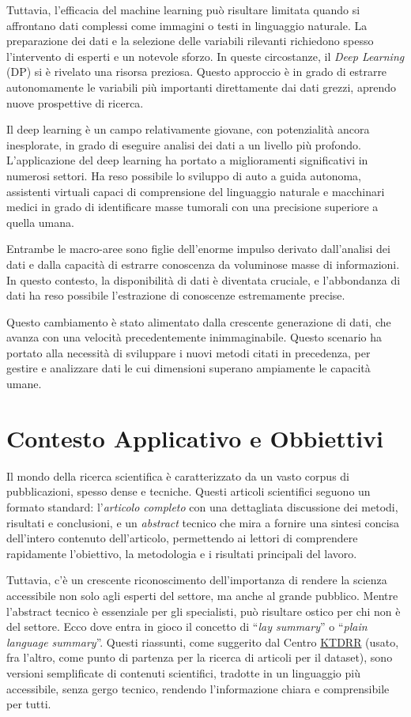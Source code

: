\documentclass[12pt,a4paper,twoside,openright]{book}
\begin{document}
Tuttavia, l'efficacia del machine learning può risultare limitata quando si affrontano dati complessi come immagini o testi in linguaggio naturale. La preparazione dei dati e la selezione delle variabili rilevanti richiedono spesso l'intervento di esperti e un notevole sforzo. In queste circostanze, il \emph{Deep Learning} (DP) si è rivelato una risorsa preziosa. Questo approccio è in grado di estrarre autonomamente le variabili più importanti direttamente dai dati grezzi, aprendo nuove prospettive di ricerca.

Il deep learning è un campo relativamente giovane, con potenzialità ancora inesplorate, in grado di eseguire analisi dei dati a un livello più profondo.
L'applicazione del deep learning ha portato a miglioramenti significativi in numerosi settori. Ha reso possibile lo sviluppo di auto a guida autonoma, assistenti virtuali capaci di comprensione del linguaggio naturale e macchinari medici in grado di identificare masse tumorali con una precisione superiore a quella umana.


Entrambe le macro-aree sono figlie dell'enorme impulso derivato dall'analisi dei dati e dalla capacità di estrarre conoscenza da voluminose masse di informazioni. In questo contesto, la disponibilità di dati è diventata cruciale, e l'abbondanza di dati ha reso possibile l'estrazione di conoscenze estremamente precise.

Questo cambiamento è stato alimentato dalla crescente generazione di dati, che avanza con una velocità precedentemente inimmaginabile. Questo scenario ha portato alla necessità di sviluppare i nuovi metodi citati in precedenza, per gestire e analizzare dati le cui dimensioni superano ampiamente le capacità umane.


\section{Contesto Applicativo e Obbiettivi}

Il mondo della ricerca scientifica è caratterizzato da un vasto corpus di pubblicazioni, spesso dense e tecniche. Questi articoli scientifici seguono un formato standard: l'\emph{articolo completo} con una dettagliata discussione dei metodi, risultati e conclusioni, e un \emph{abstract} tecnico che mira a fornire una sintesi concisa dell'intero contenuto dell'articolo, permettendo ai lettori di comprendere rapidamente l'obiettivo, la metodologia e i risultati principali del lavoro.

Tuttavia, c'è un crescente riconoscimento dell'importanza di rendere la scienza accessibile non solo agli esperti del settore, ma anche al grande pubblico. Mentre l'abstract tecnico è essenziale per gli specialisti, può risultare ostico per chi non è del settore. Ecco dove entra in gioco il concetto di ``\emph{lay summary}'' o ``\emph{plain language summary}''. Questi riassunti, come suggerito dal Centro \href{https://ktdrr.org/resources/plst/}{KTDRR} (usato, fra l'altro, come punto di partenza per la ricerca di articoli per il dataset), sono versioni semplificate di contenuti scientifici, tradotte in un linguaggio più accessibile, senza gergo tecnico, rendendo l'informazione chiara e comprensibile per tutti.
\end{document}
